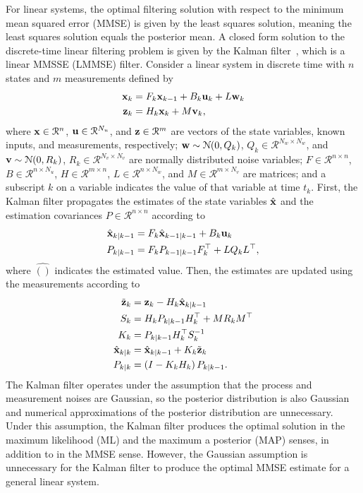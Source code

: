\documentclass[../zhang_thesis.tex]{subfiles}
\begin{document}
For linear systems, the optimal filtering solution with respect to the minimum mean squared error (MMSE) is given by the least squares solution, meaning the least squares solution equals the posterior mean. A closed form solution to the discrete-time linear filtering problem is given by the Kalman filter~\cite{kalman60}, which is a linear MMSSE (LMMSE) filter. Consider a linear system in discrete time with $n$ states and $m$ measurements defined by
\begin{align}
    \mathbf{x}_k &= F_k \mathbf{x}_{k-1} + B_k \mathbf{u}_k + L \mathbf{w}_k \\
    \mathbf{z}_k &= H_k \mathbf{x}_k + M \mathbf{v}_k,
\end{align}
where $\mathbf{x}\in\mathcal{R}^n$, $\mathbf{u}\in\mathcal{R}^{N_u}$, and $\mathbf{z}\in\mathcal{R}^m$ are vectors of the state variables, known inputs, and measurements, respectively; $\mathbf{w}\sim\mathcal{N}(0,Q_k)$, $Q_k\in\mathcal{R}^{N_w\times N_w}$, and $\mathbf{v}\sim\mathcal{N}(0,R_k)$, $R_k\in\mathcal{R}^{N_v\times N_v}$ are normally distributed noise variables; $F\in\mathcal{R}^{n\times n}$, $B\in\mathcal{R}^{n\times N_u}$, $H\in\mathcal{R}^{m\times n}$, $L\in\mathcal{R}^{n\times N_w}$, and $M\in\mathcal{R}^{m\times N_v}$ are matrices; and a subscript $k$ on a
variable indicates the value of that variable at time $t_k$. First, the Kalman filter propagates the estimates of the state variables $\hat{\mathbf{x}}$ and the estimation covariances $P\in\mathcal{R}^{n\times n}$ according to
\begin{align}
    \hat{\mathbf{x}}_{k|k-1} &= F_k \hat{\mathbf{x}}_{k-1|k-1} + B_k \mathbf{u}_k \label{eq:kfp1} \\
    P_{k|k-1} &= F_k P_{k-1|k-1} F_k^\top + L Q_k L^\top, \label{eq:kfp2}
\end{align}
where $\hat{()}$ indicates the estimated value. Then, the estimates are updated using the measurements according to
\begin{align}
    \tilde{\mathbf{z}}_k &= \mathbf{z}_k - H_k \hat{\mathbf{x}}_{k|k-1} \label{eq:kfu1} \\
    S_k &= H_k P_{k|k-1} H_k^\top + M R_k M^\top \\
    K_k &= P_{k|k-1} H_k^\top S_k^{-1} \\
    \hat{\mathbf{x}}_{k|k} &= \hat{\mathbf{x}}_{k|k-1} + K_k \tilde{\mathbf{z}}_k \\
    P_{k|k} &= \left( I - K_k H_k \right) P_{k|k-1}. \label{eq:kful} 
\end{align}
The Kalman filter operates under the assumption that the process and measurement noises are Gaussian, so the posterior distribution is also Gaussian and numerical approximations of the posterior distribution are unnecessary. Under this assumption, the Kalman filter produces the optimal solution in the maximum likelihood (ML) and the maximum a posterior (MAP) senses, in addition to in the MMSE sense. However, the Gaussian assumption is unnecessary for the Kalman filter to produce the
optimal MMSE estimate for a general linear system.
\end{document}
